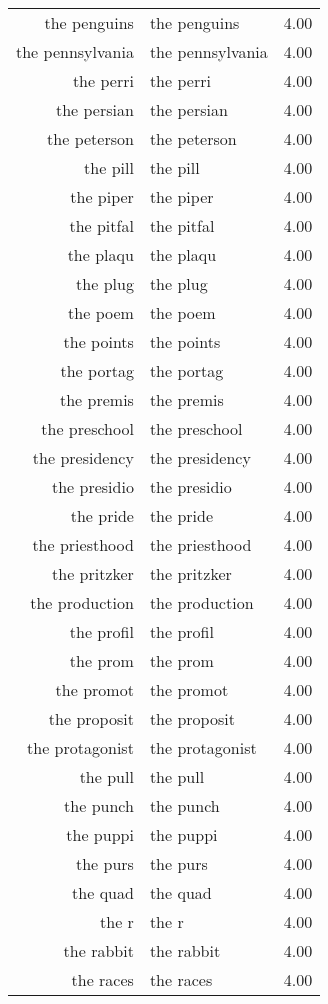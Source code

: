 \begin{table}[ht]
\begin{tabular}{rlr}
  the penguins & the penguins & 4.00 \\ 
  the pennsylvania & the pennsylvania & 4.00 \\ 
  the perri & the perri & 4.00 \\ 
  the persian & the persian & 4.00 \\ 
  the peterson & the peterson & 4.00 \\ 
  the pill & the pill & 4.00 \\ 
  the piper & the piper & 4.00 \\ 
  the pitfal & the pitfal & 4.00 \\ 
  the plaqu & the plaqu & 4.00 \\ 
  the plug & the plug & 4.00 \\ 
  the poem & the poem & 4.00 \\ 
  the points & the points & 4.00 \\ 
  the portag & the portag & 4.00 \\ 
  the premis & the premis & 4.00 \\ 
  the preschool & the preschool & 4.00 \\ 
  the presidency & the presidency & 4.00 \\ 
  the presidio & the presidio & 4.00 \\ 
  the pride & the pride & 4.00 \\ 
  the priesthood & the priesthood & 4.00 \\ 
  the pritzker & the pritzker & 4.00 \\ 
  the production & the production & 4.00 \\ 
  the profil & the profil & 4.00 \\ 
  the prom & the prom & 4.00 \\ 
  the promot & the promot & 4.00 \\ 
  the proposit & the proposit & 4.00 \\ 
  the protagonist & the protagonist & 4.00 \\ 
  the pull & the pull & 4.00 \\ 
  the punch & the punch & 4.00 \\ 
  the puppi & the puppi & 4.00 \\ 
  the purs & the purs & 4.00 \\ 
  the quad & the quad & 4.00 \\ 
  the r & the r & 4.00 \\ 
  the rabbit & the rabbit & 4.00 \\ 
  the races & the races & 4.00 \\ 

\end{tabular}
\end{table}
